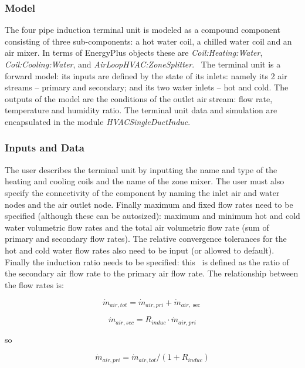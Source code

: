 \subsubsection{Model}\label{model}

The four pipe induction terminal unit is modeled as a compound component consisting of three sub-components: a hot water coil, a chilled water coil and an air mixer. In terms of EnergyPlus objects these are \emph{Coil:Heating:Water}, \emph{Coil:Cooling:Water}, and \emph{AirLoopHVAC:ZoneSplitter}.~ The terminal unit is a forward model: its inputs are defined by the state of its inlets: namely its 2 air streams -- primary and secondary; and its two water inlets -- hot and cold. The outputs of the model are the conditions of the outlet air stream: flow rate, temperature and humidity ratio. The terminal unit data and simulation are encapsulated in the module \emph{HVACSingleDuctInduc}.

\subsubsection{Inputs and Data}\label{inputs-and-data}

The user describes the terminal unit by inputting the name and type of the heating and cooling coils and the name of the zone mixer. The user must also specify the connectivity of the component by naming the inlet air and water nodes and the air outlet node. Finally maximum and fixed flow rates need to be specified (although these can be autosized): maximum and minimum hot and cold water volumetric flow rates and the total air volumetric flow rate (sum of primary and secondary flow rates). The relative convergence tolerances for the hot and cold water flow rates also need to be input (or allowed to default). Finally the induction ratio needs to be specified: this~ is defined as the ratio of the secondary air flow rate to the primary air flow rate. The relationship between the flow rates is:

\begin{equation}
{\dot m_{air,tot}} = {\dot m_{air,pri}} + {\dot m_{air,\sec }}
\end{equation}

\begin{equation}
{\dot m_{air,sec}} = {R_{induc}}\cdot {\dot m_{air,pri}}
\end{equation}

so

\begin{equation}
{\dot m_{air,pri}} = {\dot m_{air,tot}}/(1 + {R_{induc}})
\end{equation}

